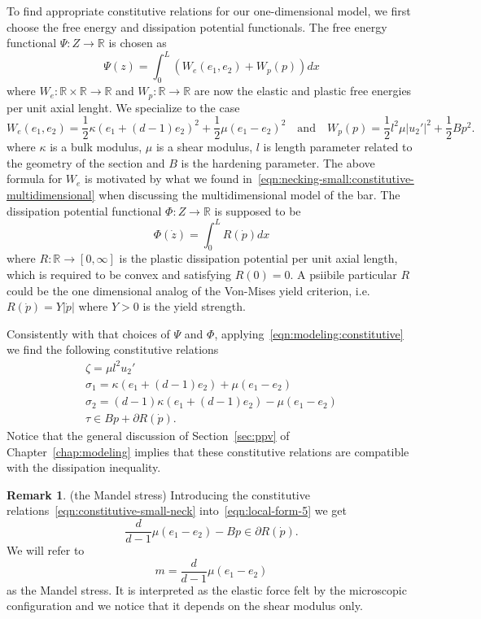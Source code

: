 \documentclass[a4paper,10pt,oneside]{amsbook}
\numberwithin{section}{chapter}
\numberwithin{equation}{chapter}
\theoremstyle{definition}
\newtheorem{rmk}[prop]{Remark}
\begin{document}
To find appropriate constitutive relations for our one-dimensional model, we first choose the free energy and dissipation potential functionals. The free energy functional $\Psi\colon Z\to\mathbb{R}$ is chosen as
\[
\Psi(z)=\int_0^L\left(W_e(e_1,e_2)+W_p(p)\right)dx
\]
where $W_e\colon\mathbb{R}\times\mathbb{R}\to\mathbb{R}$ and $W_p\colon\mathbb{R}\to\mathbb{R}$ are now the elastic and plastic free energies per unit axial lenght. We specialize to the case
\begin{equation}
\label{eqn:necking-small:free-energy-density}
W_e(e_1,e_2)=\frac{1}{2}\kappa(e_1+(d-1)e_2)^2+\frac{1}{2}\mu(e_1-e_2)^2\quad\text{and}\quad W_p(p)=\frac{1}{2}l^2\mu|u_2'|^2+\frac{1}{2}Bp^2.
\end{equation}
where $\kappa$ is a bulk modulus, $\mu$ is a shear modulus, $l$ is length parameter related to the geometry of the section and $B$ is the hardening parameter. The above formula for $W_e$ is motivated by what we found in~\eqref{eqn:necking-small:constitutive-multidimensional} when discussing the multidimensional model of the bar. The dissipation potential functional $\Phi\colon Z\to\mathbb{R}$ is supposed to be
\begin{equation}
\label{eqn:necking-small:dissipation-potential-density}
\Phi(\dot z)=\int_0^LR(\dot p)dx
\end{equation}
where $R\colon\mathbb{R}\to[0,\infty]$ is the plastic dissipation potential per unit axial length, which is required to be convex and satisfying $R(0)=0$. A psiibile particular $R$ could be the one dimensional analog of the Von-Mises yield criterion, i.e.\ $R(\dot p)=Y|\dot p|$ where $Y>0$ is the yield strength.

Consistently with that choices of $\Psi$ and $\Phi$, applying~\eqref{eqn:modeling:constitutive} we find the following constitutive relations
\begin{subequations}
\label{eqn:constitutive-small-neck}
\begin{gather}
\zeta=\mu l^2u_2' \\
\sigma_1=\kappa(e_1+(d-1)e_2)+\mu(e_1-e_2) \\
\sigma_2=(d-1)\kappa(e_1+(d-1)e_2)-\mu(e_1-e_2) \\
\tau\in Bp+\partial R(\dot p).
\end{gather}
\end{subequations}
Notice that the general discussion of Section~\ref{sec:ppv} of Chapter~\ref{chap:modeling} implies that these constitutive relations are compatible with the dissipation inequality.
\begin{rmk}(the Mandel stress)
Introducing the constitutive relations~\eqref{eqn:constitutive-small-neck} into~\eqref{eqn:local-form-5} we get
\[
\frac{d}{d-1}\mu(e_1-e_2)-Bp\in\partial R(\dot p).
\]
We will refer to
\[
m=\frac{d}{d-1}\mu(e_1-e_2)
\]
as the Mandel stress. It is interpreted as the elastic force felt by the microscopic configuration and we notice that it depends on the shear modulus only.
\end{rmk}
\end{document}
